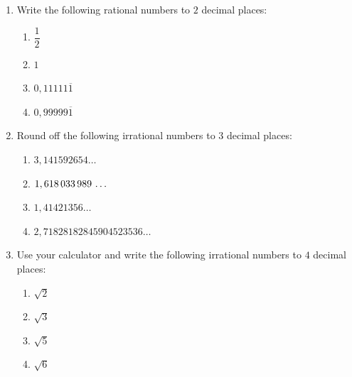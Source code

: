 \begin{eocexercises}{}
\begin{enumerate}[itemsep=5pt, label=\textbf{\arabic*}. ]


\item Write the following rational numbers to $2$ decimal places:
    \begin{enumerate}[itemsep=5pt, label=\textbf{\alph*}. ] 
    \item $\dfrac{1}{2}$\label{m38349*uid19}\item $1$
    \item $0,11111\overline{1}$\label{m38349*uid21}\item $0,99999\overline{1}$
    \end{enumerate}

\item Round off the following irrational numbers to $3$ decimal places:
\begin{multicols}{2}
    \begin{enumerate}[itemsep=5pt, label=\textbf{\alph*}. ] 
    \item $3,141592654\ldots$
    \item $1,618\phantom{\rule{0.166667em}{0ex}}033\phantom{\rule{0.166667em}{0ex}}989\phantom{\rule{0.166667em}{0ex}}\ldots$
    \item $1,41421356\ldots$
    \item $2,71828182845904523536\ldots$
    \end{enumerate}
\end{multicols}
\item Use your calculator and write the following irrational numbers to $4$ decimal places:
\begin{multicols}{2}
    \begin{enumerate}[itemsep=5pt, label=\textbf{\alph*}. ] 
    \item $\sqrt{2}$
    \item $\sqrt{3}$
    \item $\sqrt{5}$
    \item $\sqrt{6}$
    \end{enumerate}
\end{multicols}


\end{enumerate}
\end{eocexercises}
